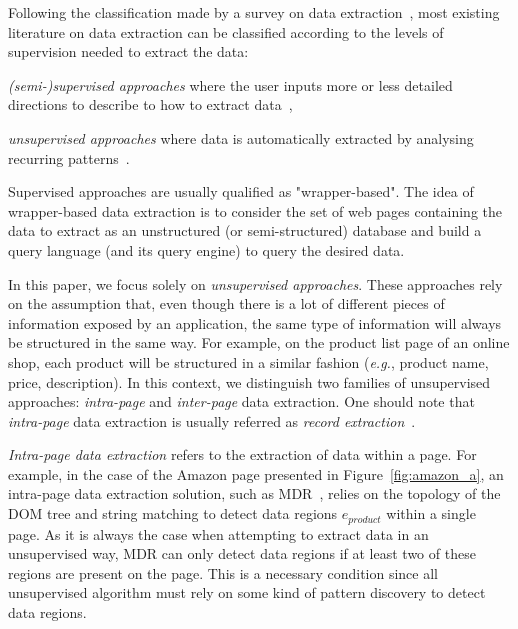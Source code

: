 Following the classification made by a survey on data extraction~\cite{Chang2006ASystems}, most existing literature on data extraction can be classified according to the levels of supervision needed to extract the data:
\begin{compactitem}
    \item \emph{(semi-)supervised approaches} where the user inputs more or less detailed directions to describe to how to extract data~\cite{Barish2000TheaterLoc:Applications,Huang2000ExtractingWEB,Levy1996QueryingDescriptions,Muslea1999ExtractionSurvey,Gottlob2004Logic-basedExtraction,Gottlob2004MonadicExtraction,Hsu1998GeneratingWeb},
    \item \emph{unsupervised approaches} where data is automatically extracted by analysing recurring patterns~\cite{Crescenzi2001RoadRunner:Sites,ArasuExtractingPages,Liu2003MiningPages,Wang2002WrapperDiscovery,Wang2002WrapperDiscovery}.
\end{compactitem}

Supervised approaches are usually qualified as "wrapper-based".
The idea of wrapper-based data extraction is to consider the set of web pages containing the data to extract as an unstructured (or semi-structured) database and build a query language (and its query engine) to query the desired data.

In this paper, we focus solely on \emph{unsupervised approaches}.
These approaches rely on the assumption that, even though there is a lot of different pieces of information exposed by an application, the same type of information will always be structured in the same way.
For example, on the product list page of an online shop, each product will be structured in a similar fashion (\emph{e.g.}, product name, price, description).
In this context, we distinguish two families of unsupervised approaches: \emph{intra-page} and \emph{inter-page} data extraction.
One should note that \emph{intra-page} data extraction is usually referred as \emph{record extraction}~\cite{Chang2006ASystems,DeReis2004AutomaticDistance}. 

\emph{Intra-page data extraction} refers to the extraction of data within a page.
For example, in the case of the Amazon page presented in Figure~\ref{fig:amazon_a}, an intra-page data extraction solution, such as MDR~\cite{Liu2003MiningPages}, relies on the topology of the DOM tree and string matching to detect data regions $\hat{e}_{product}$ within a single page.
As it is always the case when attempting to extract data in an unsupervised way, MDR can only detect data regions if at least two of these regions are present on the page.
This is a necessary condition since all unsupervised algorithm must rely on some kind of pattern discovery to detect data regions.

